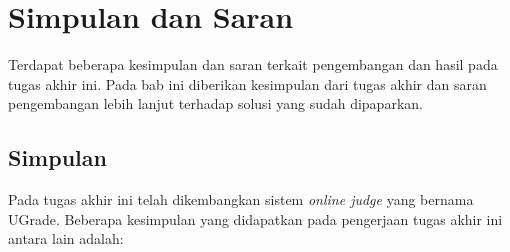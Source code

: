 \chapter{Simpulan dan Saran}


\par Terdapat beberapa kesimpulan dan saran terkait pengembangan dan hasil pada tugas akhir ini. Pada bab ini diberikan kesimpulan dari tugas akhir dan saran pengembangan lebih lanjut terhadap solusi yang sudah dipaparkan.

\section{Simpulan}

\par Pada tugas akhir ini telah dikembangkan sistem \textit{online judge} yang bernama UGrade. Beberapa kesimpulan yang didapatkan pada pengerjaan tugas akhir ini antara lain adalah:
